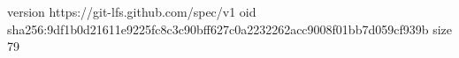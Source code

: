 version https://git-lfs.github.com/spec/v1
oid sha256:9df1b0d21611e9225fc8c3c90bff627c0a2232262acc9008f01bb7d059cf939b
size 79
